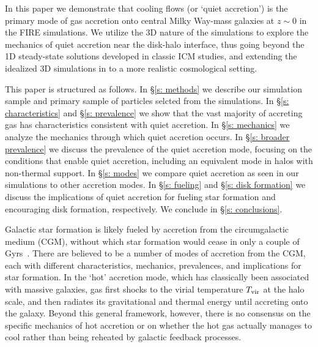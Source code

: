 \documentclass[fleqn,usenatbib]{mnras}
\newcommand{\Tvir}{T_{\rm vir}}
\begin{document}
In this paper we demonstrate that cooling flows (or `quiet accretion') is the primary mode of gas accretion onto central Milky Way-mass galaxies at $z \sim 0$ in the FIRE simulations. 
We utilize the 3D nature of the simulations to explore the mechanics of quiet accretion near the disk-halo interface, thus going beyond the 1D steady-state solutions developed in classic ICM studies, and extending the idealized 3D simulations in \cite{Stern2020} to a more realistic cosmological setting. 

This paper is structured as follows. 
In \S\ref{s: methods} we describe our simulation sample and primary sample of particles selcted from the simulations.
In \S\ref{s: characteristics} and \S\ref{s: prevalence} we show that the vast majority of accreting gas has characteristics consistent with quiet accretion.
In \S\ref{s: mechanics} we analyze the mechanics through which quiet accretion occurs.
In \S\ref{s: broader prevalence} we discuss the prevalence of the quiet accretion mode, focusing on the conditions that enable quiet accretion, including an equivalent mode in halos with non-thermal support.
In \S\ref{s: modes} we compare quiet accretion as seen in our simulations to other accretion modes.
In \S\ref{s: fueling} and \S\ref{s: disk formation} we discuss the implications of quiet accretion for fueling star formation and encouraging disk formation, respectively.
We conclude in \S\ref{s: conclusions}.



Galactic star formation is likely fueled by accretion from the circumgalactic medium (CGM), without which star formation would cease in only a couple of Gyrs~\cite[e.g.][]{Prochaska2009, Bauermeister2010, Spring2017}.
There are believed to be a number of modes of accretion from the CGM, each with different characteristics, mechanics, prevalences, and implications for star formation.
In the `hot' accretion mode, which has classically been associated with massive galaxies, gas first shocks to the virial temperature $\Tvir$ at the halo scale, and then radiates its gravitational and thermal energy until accreting onto the galaxy. Beyond this general framework, however, there is no consensus on the specific mechanics of hot accretion or on whether the hot gas actually manages to cool rather than being reheated by galactic feedback processes. 
\end{document}

